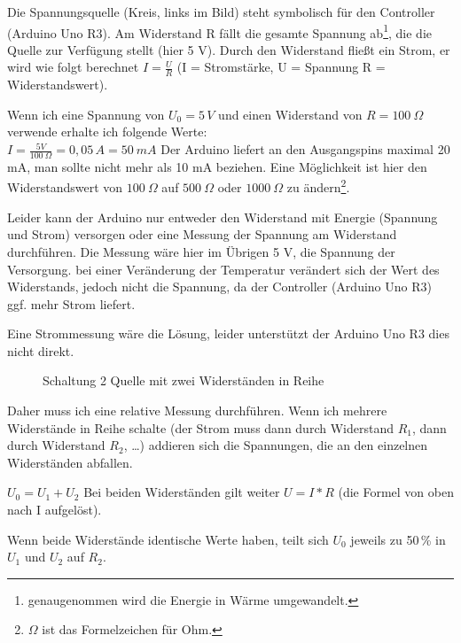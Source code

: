 \documentclass[paper = a4]{scrreprt}
\begin{document}
Die Spannungsquelle (Kreis, links im Bild) steht symbolisch für den Controller (Arduino Uno R3). Am Widerstand R fällt die gesamte Spannung ab\footnote{genaugenommen wird die Energie in Wärme umgewandelt.}, die die Quelle zur Verfügung stellt (hier 5 V). Durch den Widerstand fließt ein Strom, er wird wie folgt berechnet $I = \frac{U}{R}$ (I = Stromstärke, U = Spannung R = Widerstandswert).

Wenn ich eine Spannung von $U_0 = 5\,V$ und einen Widerstand von $R = 100\  \Omega$ verwende erhalte ich folgende Werte: \\
$I = \frac{5 V}{100\ \Omega} = 0,05\, A = 50\ mA$ Der Arduino liefert an den Ausgangspins maximal 20 mA, man sollte nicht mehr als 10 mA beziehen. Eine Möglichkeit ist hier den Widerstandswert von $100 \ \Omega$ auf $500 \ \Omega$ oder $1000\ \Omega$ zu ändern\footnote{$\Omega$ ist das Formelzeichen für Ohm.}.

Leider kann der Arduino nur entweder den Widerstand mit Energie (Spannung und Strom) versorgen oder eine Messung der Spannung am Widerstand durchführen. Die Messung wäre hier im Übrigen 5 V, die Spannung der Versorgung. bei einer Veränderung der Temperatur verändert sich der Wert des Widerstands, jedoch nicht die Spannung, da der Controller (Arduino Uno R3) ggf. mehr Strom liefert.

Eine Strommessung wäre die Lösung, leider unterstützt der Arduino Uno R3 dies nicht direkt.

\begin{figure}%
  \centering
  
  \caption{Schaltung 2 Quelle mit zwei Widerständen in Reihe}
  \label{abb:Schaltung2QuelleZweiWiderstaende}
\end{figure}

Daher muss ich eine relative Messung durchführen. Wenn ich mehrere Widerstände in Reihe schalte (der Strom muss dann durch Widerstand $R_1$, dann durch Widerstand $R_2$, \dots) addieren sich die Spannungen, die an den einzelnen Widerständen abfallen.

$U_0 = U_1 + U_2$ Bei beiden Widerständen gilt weiter $U = I * R$ (die Formel von oben nach I aufgelöst).

Wenn beide Widerstände identische Werte haben, teilt sich $U_0$ jeweils zu 50\,\% in $U_1$ und $U_2$ auf $R_2$.
\end{document}

